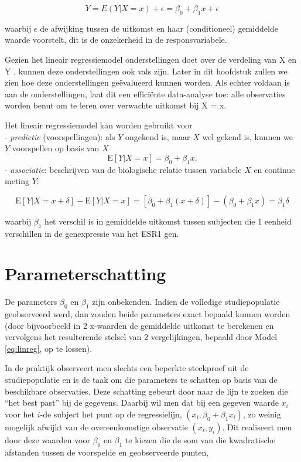 \documentclass[12pt,dutch,coursenotes]{book}
\theoremstyle{definition}
\theoremstyle{definition}
\theoremstyle{definition}
\theoremstyle{remark}
\begin{document}
\[Y=E(Y|X=x)+\epsilon=\beta_0+\beta_1 x+\epsilon\]

waarbij \(\epsilon\) de afwijking tussen de uitkomst en haar
(conditioneel) gemiddelde waarde voorstelt, dit is de onzekerheid in de
responsvariabele.

Gezien het lineair regressiemodel onderstellingen doet over de verdeling
van X en Y , kunnen deze onderstellingen ook vals zijn. Later in dit
hoofdstuk zullen we zien hoe deze onderstellingen geëvalueerd kunnen
worden. Als echter voldaan is aan de onderstellingen, laat dit een
efficiënte data-analyse toe: alle observaties worden benut om te leren
over verwachte uitkomst bij X = x.

Het lineair regressiemodel kan worden gebruikt voor\\
- \emph{predictie} (voorspellingen): als \(Y\) ongekend is, maar \(X\)
wel gekend is, kunnen we \(Y\) voorspellen op basis van \(X\)
\[\text{E}\left[Y|X =x\right]=\beta_0 + \beta_1 x.\] -
\emph{associatie}: beschrijven van de biologische relatie tussen
variabele \(X\) en continue meting \(Y\):

\[\text{E}\left[Y|X=x+\delta\right]-\text{E}\left[Y|X=x\right]= \left[\beta_0+\beta_1(x+\delta)\right]-(\beta_0+\beta_1x)=\beta_1\delta\]

waarbij \(\beta_1\) het verschil is in gemiddelde uitkomst tussen
subjecten die 1 eenheid verschillen in de genexpressie van het ESR1 gen.

\section{Parameterschatting}\label{parameterschatting}

De parameters \(\beta_0\) en \(\beta_1\) zijn onbekenden. Indien de
volledige studiepopulatie geobserveerd werd, dan zouden beide parameters
exact bepaald kunnen worden (door bijvoorbeeld in 2 x-waarden de
gemiddelde uitkomst te berekenen en vervolgens het resulterende stelsel
van 2 vergelijkingen, bepaald door Model \eqref{eq:linreg}, op te lossen).

In de praktijk observeert men slechts een beperkte steekproef uit de
studiepopulatie en is de taak om die parameters te schatten op basis van
de beschikbare observaties. Deze schatting gebeurt door naar de lijn te
zoeken die ``het best past'' bij de gegevens. Daarbij wil men dat bij
een gegeven waarde \(x_i\) voor het \(i\)-de subject het punt op de
regressielijn, \((x_i, \beta_0 + \beta_1 x_i)\), zo weinig mogelijk
afwijkt van de overeenkomstige observatie \((x_i, y_i)\). Dit realiseert
men door deze waarden voor \(\beta_0\) en \(\beta_1\) te kiezen die de
som van die kwadratische afstanden tussen de voorspelde en geobserveerde
punten,
\end{document}
